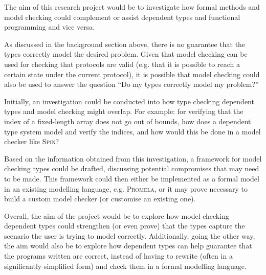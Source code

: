 \documentclass[11pt]{article}
\begin{document}
    The aim of this research project would be to investigate how formal methods
    and model checking could complement or assist dependent types and
    functional programming and vice versa.
    
    As discussed in the background section above, there is no guarantee that the
    types correctly model the desired problem. Given that model checking can be
    used for checking that protocols are valid (e.g. that it is possible to
    reach a certain state under the current protocol), it is possible that model
    checking could also be used to answer the question ``Do my types correctly
    model my problem?''
    
    Initially, an investigation could be conducted into how type checking
    dependent types and model checking might overlap. For example: for
    verifying that the index of a fixed-length array does not go out of bounds,
    how does a dependent type system model and verify the indices, and how
    would this be done in a model checker like \textsc{Spin}?
    
    Based on the information obtained from this investigation, a framework for
    model checking types could be drafted, discussing potential compromises
    that may need to be made. This framework could then either be implemented
    as a formal model in an existing modelling language, e.g. \textsc{Promela},
    or it may prove necessary to build a custom model checker (or customise an
    existing one).
    
    Overall, the aim of the project would be to explore how model checking
    dependent types could strengthen (or even prove) that the types capture the
    scenario the user is trying to model correctly. Additionally, going the
    other way, the aim would also be to explore how dependent types can help
    guarantee that the programs written are correct, instead of having to
    rewrite (often in a significantly simplified form) and check them in a
    formal modelling language.
    
    \newpage
    
    \printbibliography
    
\end{document}
